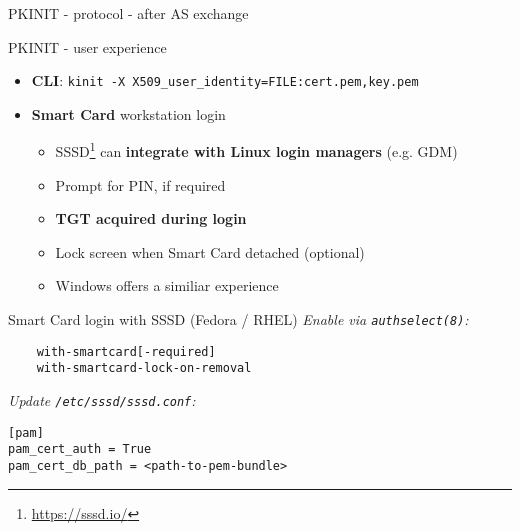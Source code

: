 \documentclass[ignorenonframetext,aspectratio=169,12pt]{beamer}
\def\svgwidth{4cm}
\begin{document}
\begin{frame}{PKINIT - protocol - after AS exchange}
\begin{center}
\def\svgwidth{\textwidth}

\end{center}
\end{frame}

\begin{frame}{PKINIT - user experience}
\protect\hypertarget{pkinit-ux}{}
\begin{itemize}
    \item {\bf CLI}: {\tt kinit -X X509\_user\_identity=FILE:cert.pem,key.pem}
    \item {\bf Smart Card} workstation login
        \begin{itemize}
            \item SSSD\footnote{\url{https://sssd.io/}} can {\bf
                integrate with Linux login managers} (e.g.  GDM)
            \item Prompt for PIN, if required
            \item {\bf TGT acquired during login}
            \item Lock screen when Smart Card detached (optional)
            \item Windows offers a similiar experience
        \end{itemize}
\end{itemize}
\end{frame}

\begin{frame}[fragile]{Smart Card login with SSSD (Fedora / RHEL)}
\protect\hypertarget{smart-card-login-sssd}{}
\emph{Enable via \texttt{authselect(8)}:}
\begin{lstlisting}[basicstyle=\ttfamily\bf]
% authselect enable-feature \
    with-smartcard[-required]
    with-smartcard-lock-on-removal
\end{lstlisting}

\emph{Update {\texttt{/etc/sssd/sssd.conf}}:}
\begin{lstlisting}[basicstyle=\ttfamily\bf]
[pam]
pam_cert_auth = True
pam_cert_db_path = <path-to-pem-bundle>
\end{lstlisting}
\end{frame}
\end{document}
